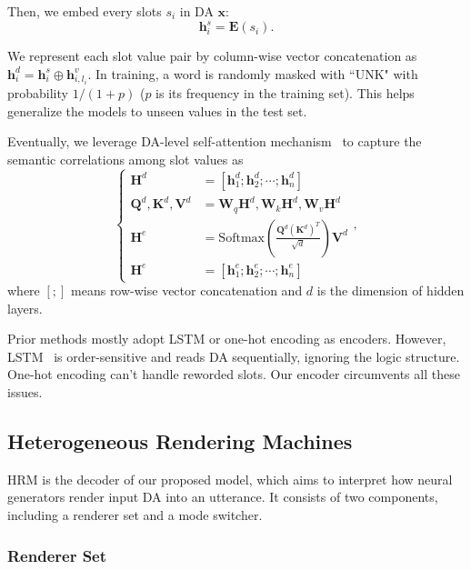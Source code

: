 \documentclass[letterpaper]{article} %
\begin{document}
	Then, we embed every slots $s_i$ in DA $\mathbf{x}$:
	\begin{equation}
	\mathbf{h}^s_i = \mathbf{E}(s_i).
	\end{equation}

	We represent each slot value pair by column-wise vector concatenation as $\mathbf{h}^d_i = \mathbf{h}^s_i \oplus \mathbf{h}_{i,l_i}^v$.  In training, a word is randomly masked with ``UNK" with probability $1 / (1 + p)$ ($p$ is its frequency in the training set). This helps generalize the models to unseen values in the test set.

	Eventually, we leverage DA-level self-attention mechanism~\citep{vaswani2017attention} to capture the semantic correlations among slot values as
	\begin{equation}
	\left\{\begin{aligned}
	\mathbf{H}^d & = [\mathbf{h}_1^d; \mathbf{h}_2^d; \cdots; \mathbf{h}_n^d] \\
	\mathbf{Q}^d, \mathbf{K}^d, \mathbf{V}^d & = \mathbf{W}_q\mathbf{H}^d, \mathbf{W}_k\mathbf{H}^d, \mathbf{W}_v\mathbf{H}^d \\
	\mathbf{H}^e & = \mathrm{Softmax}(\frac{\mathbf{Q}^d(\mathbf{K}^d)^T}{\sqrt{d}})\mathbf{V}^d \\
	\mathbf{H}^e & = [\mathbf{h}_1^e; \mathbf{h}_2^e; \cdots; \mathbf{h}_n^e]
	\end{aligned}\right.,
	\end{equation}
	where $[;]$ means row-wise vector concatenation and $d$ is the dimension of hidden layers.

	Prior methods mostly adopt LSTM or one-hot encoding as encoders. However, LSTM~\citep{hochreiter1997long} is order-sensitive and reads DA sequentially, ignoring the logic structure. One-hot encoding can't handle reworded slots. Our encoder circumvents all these issues.

\subsection{Heterogeneous Rendering Machines}
\label{sec:Heterogeneous Rendering Machines}

	HRM is the decoder of our proposed model, which aims to interpret how neural generators render input DA into an utterance. It consists of two components, including a renderer set and a mode switcher.

\subsubsection{Renderer Set}
\end{document}
